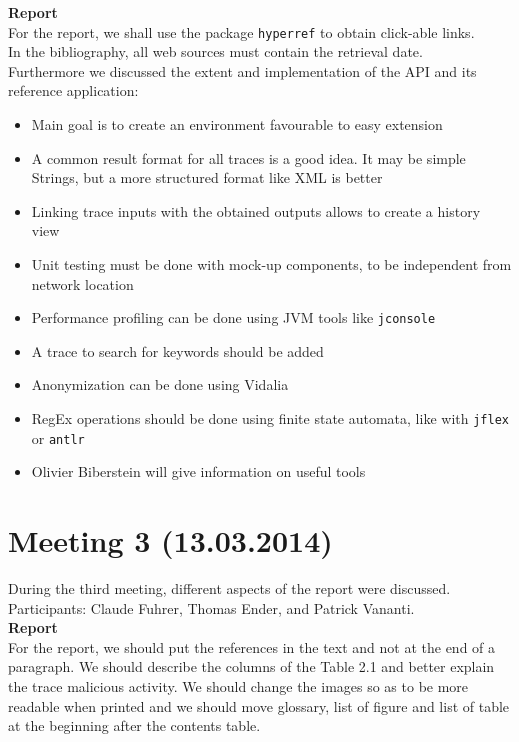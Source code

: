 \documentclass[
	a4paper,					10pt,							twoside,					openright,				notitlepage,			parskip=half,			]{scrreprt}
\begin{document}
\textbf{Report}\\
For the report, we shall use the package \verb|hyperref| to obtain click-able links. \\
In the bibliography, all web sources must contain the retrieval date.\\
Furthermore we discussed the extent and implementation of the API and its reference application:
\begin{itemize}
\item{Main goal is to create an environment favourable to easy extension}
\item{A common result format for all traces is a good idea. It may be simple Strings, but a more structured format like XML is better}
\item{Linking trace inputs with the obtained outputs allows to create a history view}
\item{Unit testing must be done with mock-up components, to be independent from network location}
\item{Performance profiling can be done using JVM tools like \verb|jconsole|}
\item{A trace to search for keywords should be added}
\item{Anonymization can be done using Vidalia}
\item{RegEx operations should be done using finite state automata, like with \verb|jflex| or \verb|antlr|}
\item{Olivier Biberstein will give information on useful tools}
\end{itemize}

\section*{Meeting 3 (13.03.2014)}
\label{sec:meeting_3}

During the third meeting, different aspects of the report were discussed.\\
Participants: Claude Fuhrer, Thomas Ender, and Patrick Vananti.\\

\textbf{Report}\\
For the report, we should put the references in the text and not at the end of a paragraph. We should describe the columns of the Table 2.1 and better explain the trace malicious activity. We should change the images so as to be more readable when printed and we should move glossary, list of figure and list of table at the beginning after the contents table.
\end{document}
